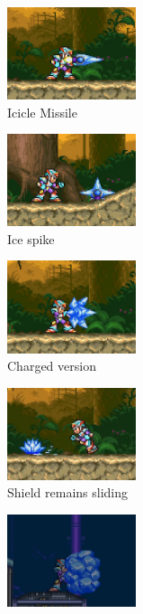 \begin{figure}[htp]
	\centering
	\begin{subfigure}{3.9cm}
		\centering
		\includegraphics[height=2.7cm]{figures/X3/weapons/F_shield.png}
		\caption{Icicle Missile}	
	\end{subfigure}
	\begin{subfigure}{3.9cm}
		\centering
		\includegraphics[height=2.7cm]{figures/X3/weapons/F_shield_1.jpg}
		\caption{Ice spike}	
	\end{subfigure}
	\begin{subfigure}{3.9cm}
		\centering
		\includegraphics[height=2.7cm]{figures/X3/weapons/F_shield_C.png}
		\caption{Charged version}	
	\end{subfigure}
	\begin{subfigure}{3.9cm}
		\centering
		\includegraphics[height=2.7cm]{figures/X3/weapons/F_shield_C_1.png}
		\caption{Shield remains sliding}	
	\end{subfigure}
	\begin{subfigure}{3.9cm}
		\centering
		\includegraphics[height=2.7cm]{figures/X3/weapons/F_shield_C_2.png}

\end{subfigure}
\end{figure}
